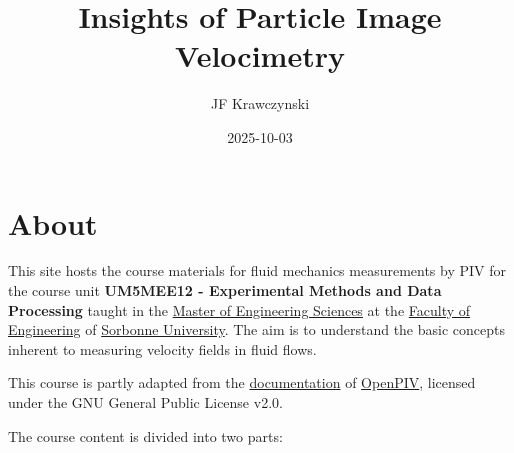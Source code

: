 \documentclass[
  english,
  letterpaper,
  numbers=noendperiod,
  DIV=13]{scrreprt}
\title{Insights of Particle Image Velocimetry}
\author{JF Krawczynski}
\date{2025-10-03}
\renewcommand*\contentsname{Table of contents}
\newcommand\contentsname{Table of contents}
\begin{document}
\maketitle

\renewcommand*\contentsname{Table of contents}
{
\hypersetup{linkcolor=}
\setcounter{tocdepth}{2}
\tableofcontents
}


\chapter*{About}\label{about}


This site hosts the course materials for fluid mechanics measurements by
PIV for the course unit \textbf{UM5MEE12 - Experimental Methods and Data
Processing} taught in the
\href{https://masters-sdi.sorbonne-universite.fr/la-mention-mecanique}{Master
of Engineering Sciences} at the
\href{https://sciences.sorbonne-universite.fr/faculte/ufr-instituts-observatoires-ecoles/ufr-dingenierie}{Faculty
of Engineering} of \href{https://www.sorbonne-universite.fr/}{Sorbonne
University}. The aim is to understand the basic concepts inherent to
measuring velocity fields in fluid flows.

\begin{tcolorbox}[enhanced jigsaw, coltitle=black, bottomrule=.15mm, colbacktitle=quarto-callout-note-color!10!white, toprule=.15mm, titlerule=0mm, opacityback=0, breakable, leftrule=.75mm, toptitle=1mm, colback=white, arc=.35mm, colframe=quarto-callout-note-color-frame, bottomtitle=1mm, opacitybacktitle=0.6, left=2mm, title=\textcolor{quarto-callout-note-color}{\faInfo}\hspace{0.5em}{Note}, rightrule=.15mm]

This course is partly adapted from the
\href{https://github.com/OpenPIV/openpiv-python}{documentation} of
\href{https://doi.org/10.5281/zenodo.4409178}{OpenPIV}, licensed under
the GNU General Public License v2.0.

\end{tcolorbox}

The course content is divided into two parts:
\end{document}
